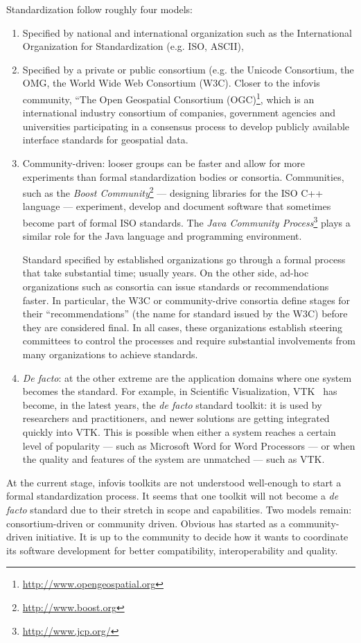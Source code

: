 Standardization follow roughly four models: 
\begin{enumerate}[noitemsep]
\item Specified by national and international organization such as the
  International Organization for Standardization (e.g. ISO, ASCII),

\item Specified by a private or public consortium (e.g. the Unicode
  Consortium, the OMG, the World Wide Web Consortium (W3C). Closer to
  the infovis community, ``The Open Geospatial
  Consortium (OGC)\footnote{\url{http://www.opengeospatial.org}},
  which is an international industry consortium of companies,
  government agencies and universities participating in a consensus
  process to develop publicly available interface standards for
  geospatial data.

\item Community-driven: looser groups can be faster and allow for more
  experiments than formal standardization bodies or consortia.
  Communities, such as the \emph{Boost
    Community}\footnote{\url{http://www.boost.org}} --- designing
  libraries for the ISO C++ language --- experiment, develop and
  document software that sometimes become part of formal ISO
  standards.  The \emph{Java Community
    Process}\footnote{\url{http://www.jcp.org/}} plays a similar role
  for the Java language and programming environment.

  Standard specified by established organizations go through a formal
  process that take substantial time; usually years.  On the other
  side, ad-hoc organizations such as consortia can issue standards or
  recommendations faster.  In particular, the W3C or community-drive
  consortia define stages for their ``recommendations'' (the name for
  standard issued by the W3C) before they are considered final.  In
  all cases, these organizations establish steering committees to
  control the processes and require substantial involvements from many
  organizations to achieve standards.

\item \textit{De facto}: at the other extreme are the application
  domains where one system becomes the standard.  For example, in
  Scientific Visualization, VTK~\cite{VTK} has become, in the latest
  years, the \textit{de facto} standard toolkit: it is used by
  researchers and practitioners, and newer solutions are getting
  integrated quickly into VTK.  This is possible when either a
  system reaches a certain level of popularity --- such as Microsoft
  Word for Word Processors --- or when the quality and features of the
  system are unmatched --- such as VTK.
\end{enumerate}

At the current stage, infovis toolkits are not
understood well-enough to start a formal standardization process.  It
seems that one toolkit will not become a \textit{de facto} standard
due to their stretch in scope and capabilities.  Two models remain:
consortium-driven or community driven.  Obvious has started as a
community-driven initiative.  It is up to the community to decide how
it wants to coordinate its software development for better
compatibility, interoperability and quality.
